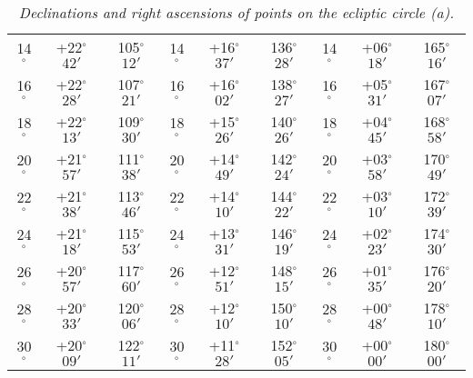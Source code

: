 \begin{table}
\begin{tabular}{ccc|ccc|ccc}
14$^\circ$ & +22$^\circ$$42'$ & 105$^\circ$$12'$ & 14$^\circ$ & +16$^\circ$$37'$ & 136$^\circ$$28'$ & 14$^\circ$ & +06$^\circ$$18'$ & 165$^\circ$$16'$\\
16$^\circ$ & +22$^\circ$$28'$ & 107$^\circ$$21'$ & 16$^\circ$ & +16$^\circ$$02'$ & 138$^\circ$$27'$ & 16$^\circ$ & +05$^\circ$$31'$ & 167$^\circ$$07'$\\
18$^\circ$ & +22$^\circ$$13'$ & 109$^\circ$$30'$ & 18$^\circ$ & +15$^\circ$$26'$ & 140$^\circ$$26'$ & 18$^\circ$ & +04$^\circ$$45'$ & 168$^\circ$$58'$\\
20$^\circ$ & +21$^\circ$$57'$ & 111$^\circ$$38'$ & 20$^\circ$ & +14$^\circ$$49'$ & 142$^\circ$$24'$ & 20$^\circ$ & +03$^\circ$$58'$ & 170$^\circ$$49'$\\
22$^\circ$ & +21$^\circ$$38'$ & 113$^\circ$$46'$ & 22$^\circ$ & +14$^\circ$$10'$ & 144$^\circ$$22'$ & 22$^\circ$ & +03$^\circ$$10'$ & 172$^\circ$$39'$\\
24$^\circ$ & +21$^\circ$$18'$ & 115$^\circ$$53'$ & 24$^\circ$ & +13$^\circ$$31'$ & 146$^\circ$$19'$ & 24$^\circ$ & +02$^\circ$$23'$ & 174$^\circ$$30'$\\
26$^\circ$ & +20$^\circ$$57'$ & 117$^\circ$$60'$ & 26$^\circ$ & +12$^\circ$$51'$ & 148$^\circ$$15'$ & 26$^\circ$ & +01$^\circ$$35'$ & 176$^\circ$$20'$\\
28$^\circ$ & +20$^\circ$$33'$ & 120$^\circ$$06'$ & 28$^\circ$ & +12$^\circ$$10'$ & 150$^\circ$$10'$ & 28$^\circ$ & +00$^\circ$$48'$ & 178$^\circ$$10'$\\
30$^\circ$ & +20$^\circ$$09'$ & 122$^\circ$$11'$ & 30$^\circ$ & +11$^\circ$$28'$ & 152$^\circ$$05'$ & 30$^\circ$ & +00$^\circ$$00'$ & 180$^\circ$$00'$\\
\end{tabular}
\caption{\em Declinations and right ascensions of points on the ecliptic circle (a).}\label{tec1}
\end{table}

